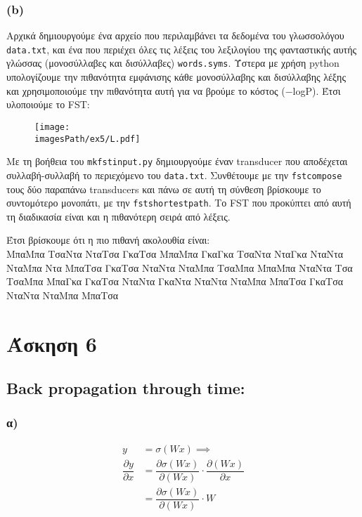 \documentclass[12pt,a4paper]{article}
\newcommand{\imagesPath}{/home/nick/shmmy/8th/slp/slp-ntua/set2}
\begin{document}
			\subsubsection*{(b)} 
				Αρχικά δημιουργούμε ένα αρχείο που περιλαμβάνει τα δεδομένα του γλωσσολόγου \verb|data.txt|, και ένα που περιέχει όλες τις λέξεις του λεξιλογίου της φανταστικής αυτής γλώσσας (μονοσύλλαβες και δισύλλαβες) \verb|words.syms|. Ύστερα με χρήση python υπολογίζουμε την πιθανότητα εμφάνισης κάθε μονοσύλλαβης και δισύλλαβης λέξης και χρησιμοποιούμε την πιθανότητα αυτή για να βρούμε το κόστος ($-$logP). Έτσι υλοποιούμε το FST:
				
				\begin{figure}[H]
					\begin{center}
						\texttt{[image: \\imagesPath/ex5/L.pdf]}
					\end{center}
				\end{figure}
				
				
				Με τη βοήθεια του \verb|mkfstinput.py| δημιουργούμε έναν transducer που αποδέχεται συλλαβή-συλλαβή το περιεχόμενο του \verb|data.txt|. Συνθέτουμε με την \verb|fstcompose| τους δύο παραπάνω transducers και πάνω σε αυτή τη σύνθεση βρίσκουμε το συντομότερο μονοπάτι, με την \verb|fstshortestpath|. Το FST που προκύπτει από αυτή τη διαδικασία είναι και η πιθανότερη σειρά από λέξεις.
				
				Έτσι βρίσκουμε ότι η πιο πιθανή ακολουθία είναι: \\
				
				ΜπαΜπα ΤσαΝτα ΝταΤσα ΓκαΤσα ΜπαΜπα ΓκαΓκα ΤσαΝτα ΝταΓκα ΝταΝτα ΝταΜπα Ντα ΜπαΤσα ΓκαΤσα ΝταΝτα ΝταΜπα ΤσαΜπα ΜπαΜπα ΝταΝτα Τσα ΤσαΜπα ΜπαΓκα ΓκαΤσα ΝταΝτα ΓκαΝτα ΝταΝτα ΝταΜπα ΜπαΤσα ΓκαΤσα ΝταΝτα ΝταΜπα ΜπαΤσα 
				
			
	\section*{Άσκηση 6}
		
		\subsection*{Back propagation through time:}
		
			\subsubsection*{α)}
				\begin{align*}
					y &= \sigma (W x) \implies \\
					\dfrac{\partial y}{\partial x} &= \dfrac{\partial \sigma (Wx)}{\partial(Wx)} \cdot \dfrac{\partial(Wx)}{\partial x} \\
					&= \dfrac{\partial \sigma (Wx)}{\partial(Wx)} \cdot W \\
				\end{align*}
				
\end{document}
